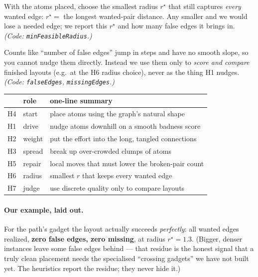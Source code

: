 \documentclass[11pt]{article}
\begin{document}
\begin{description}[leftmargin=0pt,itemsep=4pt]
\item[\textcolor{blue!60!black}{H6 --- pick the radius.}]
  With the atoms placed, choose the smallest radius $r^\star$ that still captures
  \emph{every} wanted edge: $r^\star = $ the longest wanted-pair distance. Any
  smaller and we would lose a needed edge; we report this $r^\star$ and how many
  false edges it brings in. \emph{(Code: \texttt{minFeasibleRadius}.)}

\item[\textcolor{blue!60!black}{H7 --- judge, don't optimise, the discrete stuff.}]
  Counts like ``number of false edges'' jump in steps and have no smooth slope, so
  you cannot nudge them directly. Instead we use them only to \emph{score and
  compare} finished layouts (e.g.\ at the H6 radius choice), never as the thing
  H1 nudges. \emph{(Code: \texttt{falseEdges}, \texttt{missingEdges}.)}
\end{description}

\begin{center}
\renewcommand{\arraystretch}{1.15}
\begin{tabular}{@{}llp{6.6cm}@{}}
\toprule
 & role & one-line summary \\
\midrule
H4 & start  & place atoms using the graph's natural shape \\
H1 & drive  & nudge atoms downhill on a smooth badness score \\
H2 & weight & put the effort into the long, tangled connections \\
H3 & spread & break up over-crowded clumps of atoms \\
H5 & repair & local moves that must lower the broken-pair count \\
H6 & radius & smallest $r$ that keeps every wanted edge \\
H7 & judge  & use discrete quality only to compare layouts \\
\bottomrule
\end{tabular}
\end{center}

\paragraph{Our example, laid out.} For the path's gadget the layout actually
succeeds \emph{perfectly}: all wanted edges realized, \textbf{zero false edges,
zero missing}, at radius $r^\star=1.3$. (Bigger, denser instances leave some false
edges behind --- that residue is the honest signal that a truly clean placement
needs the specialised ``crossing gadgets'' we have not built yet. The heuristics
report the residue; they never hide it.)
\end{document}
